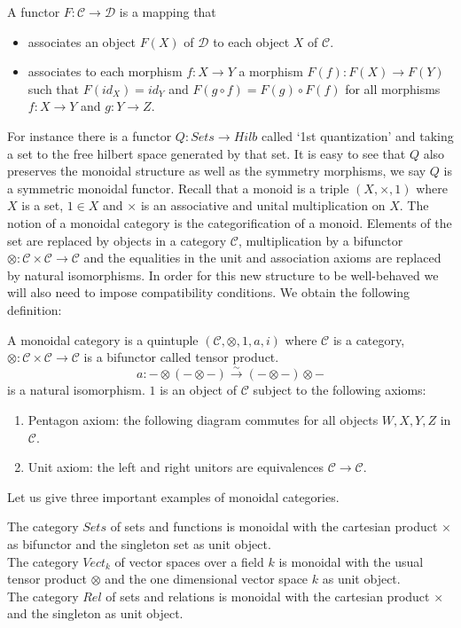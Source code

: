 \documentclass{article}
\newenvironment{definition}[1][Definition]{\begin{trivlist}
\item[\hskip \labelsep {\bfseries #1}]}{\end{trivlist}}
\newenvironment{example}[1][Example]{\begin{trivlist}
\item[\hskip \labelsep {\bfseries #1}]}{\end{trivlist}}
\begin{document}
\begin{definition}
	A functor $F:\mathcal{C} \rightarrow \mathcal{D}$ is a mapping that
	\begin{itemize}
		\item associates an object $F(X)$ of $\mathcal{D}$ to each object $X$ of $\mathcal{C}$.
		\item associates to each morphism $f:X \rightarrow Y$ a morphism $F(f): F(X) \rightarrow F(Y)$ such that $F(id_X)=id_Y$ and $F(g\circ f)= F(g)\circ F(f)$ for all morphisms $f:X \rightarrow Y$ and $g:Y \rightarrow Z$.
	\end{itemize}
\end{definition}For instance there is a functor $Q: Sets \rightarrow Hilb$ called `1st quantization' and taking a set to the free hilbert space generated by that set. It is easy to see that $Q$ also preserves the monoidal structure as well as the symmetry morphisms, we say $Q$ is a symmetric monoidal functor.
Recall that a monoid is a triple $(X, \times, 1)$ where $X$ is a set, $1 \in X$ and $\times$ is an associative and unital multiplication on $X$. The notion of a monoidal category is the categorification of a monoid. Elements of the set are replaced by objects in a category $\mathcal{C}$, multiplication by a bifunctor $\otimes: \mathcal{C} \times \mathcal{C} \rightarrow \mathcal{C}$ and the equalities in the unit and association axioms are replaced by natural isomorphisms. In order for this new structure to be well-behaved we will also need to impose compatibility conditions.
We obtain the following definition:
\begin{definition}
A monoidal category is a quintuple $(\mathcal{C}, \otimes, 1, a, i)$ where $\mathcal{C}$ is a category, $\otimes: \mathcal{C} \times \mathcal{C} \rightarrow \mathcal{C}$ is a bifunctor called tensor product.
$$ a : -\otimes(- \otimes -) \xrightarrow{\sim} (-\otimes -) \otimes -$$ is a natural isomorphism. $1$ is an object of $\mathcal{C}$ subject to the following axioms:
\begin{enumerate}
    \item Pentagon axiom: the following diagram commutes for all objects $W,X,Y,Z$ in $\mathcal{C}$.
    \item Unit axiom: the left and right unitors are equivalences $\mathcal{C} \rightarrow \mathcal{C}$.
\end{enumerate}
\end{definition}
Let us give three important examples of monoidal categories.
\begin{example}
The category $Sets$ of sets and functions is monoidal with the cartesian product $\times$ as bifunctor and the singleton set as unit object.\\
The category $Vect_k$ of vector spaces over a field $k$ is monoidal with the usual tensor product $\otimes$ and the one dimensional vector space $k$ as unit object.\\
The category $Rel$ of sets and relations is monoidal with the cartesian product $\times$ and the singleton as unit object.
\end{example}
\end{document}
